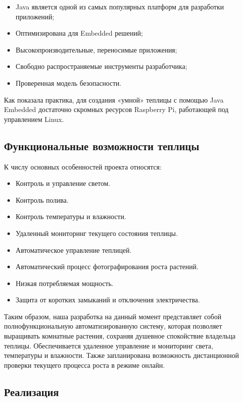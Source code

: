\documentclass[10pt, a5paper]{article}
\begin{document}
\begin{itemize}
  \item Java является одной из самых популярных платформ для разработки приложений;
  \item Оптимизирована для Embedded решений;
  \item Высокопроизводительные, переносимые приложения;
  \item Свободно распространяемые инструменты разработчика;
  \item Проверенная модель безопасности.
\end{itemize}

Как показала практика, для создания «умной» теплицы с помощью Java Embedded достаточно скромных ресурсов Raspberry Pi, работающей под управлением Linux.

\subsection*{Функциональные возможности теплицы}

К числу основных особенностей проекта относятся:

\begin{itemize}
  \item Контроль и управление светом.
  \item Контроль полива.
  \item Контроль температуры и влажности.
  \item Удаленный мониторинг текущего состояния теплицы.
  \item Автоматическое управление теплицей.
  \item Автоматический процесс фотографирования роста растений.
  \item Низкая потребляемая мощность.
  \item Защита от коротких замыканий и отключения электричества.
\end{itemize}

Таким образом, наша разработка на данный момент представляет собой полнофункциональную автоматизированную систему, которая позволяет выращивать комнатные растения, сохраняя душевное спокойствие владельца теплицы. Обеспечивается удаленное управление и мониторинг света, температуры и влажности. Также запланирована возможность дистанционной проверки текущего процесса роста в режиме онлайн.

\subsection*{Реализация}
\end{document}
